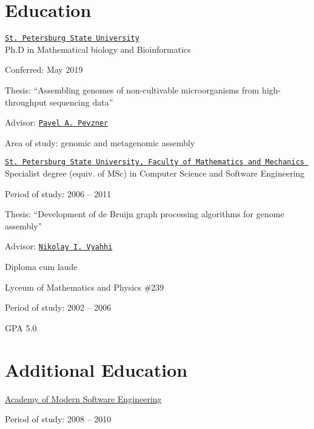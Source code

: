 
\section{Education}
\href{http://english.spbu.ru/}{\tt St.~Petersburg State University}\\
  Ph.D in Mathematical biology and Bioinformatics
\begin{innerlist}
  \item Conferred: May 2019
  \item Thesis: ``Assembling genomes of non-cultivable microorganisms from high-throughput sequencing data''
  \item Advisor: \href{http://cseweb.ucsd.edu/~ppevzner/}{\tt Pavel A.~Pevzner}
  \item Area of study: genomic and metagenomic assembly
\end{innerlist}

\blankline

\href{http://www.math.spbu.ru/en/index.html}{\tt St.~Petersburg State University, Faculty of Mathematics and Mechanics%
}\\
  Specialist degree (equiv. of MSc) in Computer Science and Software Engineering
\begin{innerlist}
  \item Period of study: 2006 -- 2011
  \item Thesis: ``Development of de Bruijn graph processing algorithms for genome assembly'' 
  \item Advisor: \href{http://spbsu.ru/vyahhi/}{\tt Nikolay I.~Vyahhi}
  \item Diploma cum laude
\end{innerlist}

\blankline

Lyceum of Mathematics and Physics \#239 
\begin{innerlist}
  \item Period of study: 2002 -- 2006
  \item GPA 5.0
\end{innerlist}

\section{Additional Education}
\href{http://www.amse.ru/}{Academy of Modern Software Engineering}
\begin{innerlist}
  \item Period of study: 2008 -- 2010
\end{innerlist}

